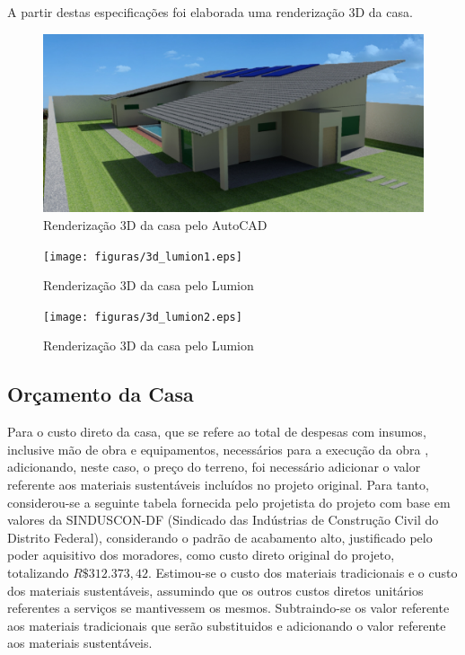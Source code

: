 A partir destas especificações foi elaborada uma renderização 3D da casa.
\newpage

\begin{figure}[H]
  \begin{center}
	\includegraphics[keepaspectratio,scale=0.42,angle=0]{figuras/3d_cad.eps}
	\caption{Renderização 3D da casa pelo AutoCAD}
  \end{center}
\end{figure}

\begin{figure}[H]
  \begin{center}
	\texttt{[image: figuras/3d\_lumion1.eps]}
	\caption{Renderização 3D da casa pelo Lumion}
  \end{center}
\end{figure}

\begin{figure}[H]
  \begin{center}
	\texttt{[image: figuras/3d\_lumion2.eps]}
	\caption{Renderização 3D da casa pelo Lumion}
  \end{center}
\end{figure}

\subsection{Orçamento da Casa}

	Para o custo direto da casa, que se refere ao total de despesas com insumos, inclusive mão de obra e equipamentos, necessários para a execução da obra \cite{IBEC}, adicionando, neste caso, o preço do terreno, foi necessário adicionar o valor referente aos materiais sustentáveis incluídos no projeto original. Para tanto, considerou-se a seguinte tabela fornecida pelo projetista do projeto com base em valores da SINDUSCON-DF (Sindicado das Indústrias de Construção Civil do Distrito Federal), considerando o padrão de acabamento alto, justificado pelo poder aquisitivo dos moradores, como custo direto original do projeto, totalizando $R\$312.373,42$.  Estimou-se o custo dos materiais tradicionais e o custo dos materiais sustentáveis, assumindo que os outros custos diretos unitários referentes a serviços se mantivessem os mesmos. Subtraindo-se os valor referente aos materiais tradicionais que serão substituidos e adicionando o valor referente aos materiais sustentáveis.

